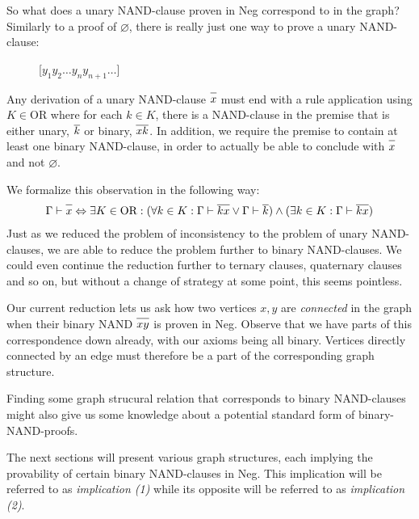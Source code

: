 So what does a unary NAND-clause proven in Neg correspond to in the graph?
Similarly to a proof of $\varnothing$, there is really just one way to prove a unary NAND-clause:\par
\begin{figure}[!h]
  \centering
  \begin{prooftree*}
    \Hypo{\dots}
    \Hypo{\dots}
    [$y_1y_2\dots y_ny_{n+1}\dots$]{}
  \end{prooftree*}
  \caption{}
  \label{fig:proof_unary_nand}
\end{figure}
Any derivation of a unary NAND-clause $\ol{x}$ must end with a rule application using $K \in \text{OR}$ where for each $k \in K$, there is a NAND-clause in the premise that is either unary, $\ol{k}$ or binary, $\ol{xk}$.
In addition, we require the premise to contain at least one binary NAND-clause, in order to actually be able to conclude with $\ol x$ and not $\varnothing$.

We formalize this observation in the following way:
\begin{align}
  \Gamma \vdash \ol{x} \Leftrightarrow \exists K \in \text{OR}: (\forall k \in K: \Gamma \vdash \ol{kx} \vee \Gamma \vdash \ol{k}) \wedge (\exists k \in K: \Gamma \vdash \ol{kx})
\end{align}
Just as we reduced the problem of inconsistency to the problem of unary NAND-clauses, we are able to reduce the problem further to binary NAND-clauses.
We could even continue the reduction further to ternary clauses, quaternary clauses and so on, but without a change of strategy at some point, this seems pointless.

Our current reduction lets us ask how two vertices $x,y$ are \textit{connected} in the graph when their binary NAND $\ol{xy}$ is proven in Neg.
Observe that we have parts of this correspondence down already, with our axioms being all binary.
Vertices directly connected by an edge must therefore be a part of the corresponding graph structure.

Finding some graph strucural relation that corresponds to binary NAND-clauses might also give us some knowledge about a potential standard form of binary-NAND-proofs.

The next sections will present various graph structures, each implying the provability of certain binary NAND-clauses in Neg.
This implication will be referred to as \textit{implication (1)} while its opposite will be referred to as \textit{implication (2)}.


